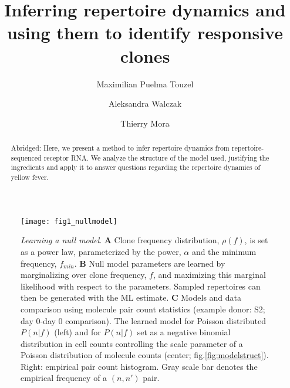 \documentclass[letterpaper,english,prl,reprint,longbibliography]{revtex4-1} %
\begin{document}

\title{Inferring repertoire dynamics and using them to identify responsive clones}

\author{Maximilian Puelma Touzel}


\author{Aleksandra Walczak}


\author{Thierry Mora}


\vspace{0.5cm}


\begin{abstract}
Abridged: Here, we present a method to infer repertoire dynamics from repertoire-sequenced receptor RNA. We analyze the structure of the model used, justifying the ingredients and apply it to answer questions regarding the repertoire dynamics of yellow fever.



\end{abstract}


\pacs{}

\maketitle

\begin{figure}[ht!]
\texttt{[image: fig1\_nullmodel]}
\centering{}
\caption{
\emph{Learning a null model}. \textbf{A} Clone frequency distribution, $\rho(f)$, is set as a power law, parameterized by the power, $\alpha$ and the minimum frequency, $f_{min}$. \textbf{B} Null model parameters are learned by marginalizing over clone frequency, $f$, and maximizing this marginal likelihood with respect to the parameters. Sampled repertoires can then be generated with the ML estimate. \textbf{C} Models and data comparison using molecule pair count statistics (example donor: S2; day 0-day 0 comparison). The learned model for Poisson distributed $P(n|f)$ (left) and for $P(n|f)$ set as a negative binomial distribution in cell counts controlling the scale parameter of a Poisson distribution of molecule counts (center; fig.\ref{fig:modelstruct}). Right: empirical pair count histogram. Gray scale bar denotes the empirical frequency of a $(n,n')$ pair.
\label{fig:nullstats}}
\end{figure}
\end{document}
